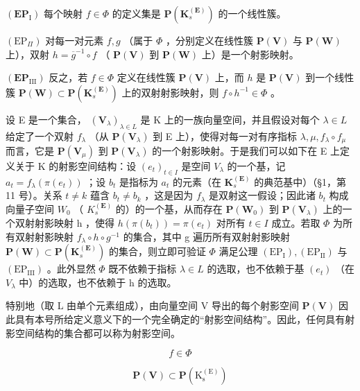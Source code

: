 \((\mathbf{EP}_{\mathrm{I}})\) 每个映射 \(f \in \Phi\) 的定义集是 \(\mathbf{P}(\mathbf{K}_s^{(\mathbf{E})})\) 的一个线性簇。

\((\mathrm{EP}_{\Pi})\) 对每一对元素 \(f, g\) （属于 \(\Phi\) ，分别定义在线性簇 \(\mathbf{P}(\mathbf{V})\) 与 \(\mathbf{P}(\mathbf{W})\) 上），双射 \(h = \overline{g}^{-1} \circ f\) （ \(\mathbf{P}(\mathbf{V})\) 到 \(\mathbf{P}(\mathbf{W})\) 上）是一个射影映射。

\((\mathbf{EP}_{\mathrm{III}})\) 反之，若 \(f \in \Phi\) 定义在线性簇 \(\mathbf{P}(\mathbf{V})\) 上，而 \(h\) 是 \(\mathbf{P}(\mathbf{V})\) 到一个线性簇 \(\mathbf{P}(\mathbf{W}) \subset \mathbf{P}(\mathbf{K}_s^{\mathbf{(E)}})\) 上的双射射影映射，则 \(f \circ h^{-1} \in \Phi\) 。

设 E 是一个集合， \((\mathbf{V}_{\lambda})_{\lambda \in L}\) 是 K 上的一族向量空间，并且假设对每个 \(\lambda \in L\) 给定了一个双射 \(f_{\lambda}\) （从 \(\mathbf{P}(\mathbf{V}_{\lambda})\) 到 E 上），使得对每一对有序指标 \(\lambda, \mu, f_{\lambda} \circ f_{\mu}\) 而言，它是 \(\mathbf{P}(\mathbf{V}_{\mu})\) 到 \(\mathbf{P}(\mathbf{V}_{\lambda})\) 的一个射影映射。于是我们可以如下在 E 上定义关于 K 的射影空间结构：设 \((e_{t})_{t \in I}\) 是空间 \(V_{\lambda}\) 的一个基，记 \(a_{t} = f_{\lambda}(\pi(e_{t}))\) ；设 \(b_{t}\) 是指标为 \(a_{t}\) 的元素（在 \(\mathbf{K}_{s}^{(\mathbf{E})}\) 的典范基中）（§1，第 11 号）。关系 \(t \neq k\) 蕴含 \(b_{t} \neq b_{k}\) ，这是因为 \(f_{\lambda}\) 是双射这一假设；因此诸 \(b_{t}\) 构成向量子空间 \(W_{0}\) （ \(K_{s}^{(\mathbf{E})}\) 的）的一个基，从而存在 \(\mathbf{P}(\mathbf{W}_{0})\) 到 \(\mathbf{P}(\mathbf{V}_{\lambda})\) 上的一个双射射影映射 h ，使得 \(h(\pi(b_{t})) = \pi(e_{t})\) 对所有 \(t \in I\) 成立。若取 \(\Phi\) 为所有双射射影映射 \(f_{\lambda} \circ h \circ g^{-1}\) 的集合，其中 g 遍历所有双射射影映射 \(\mathbf{P}(\mathbf{W}) \subset \mathbf{P}(\mathbf{K}_{s}^{(\mathbf{E})})\) 的集合，则立即可验证 \(\Phi\) 满足公理 \((\mathrm{EP}_{\mathrm{I}}), (\mathrm{EP}_{\mathrm{II}})\) 与 \((\mathrm{EP}_{\mathrm{III}})\) 。此外显然 \(\Phi\) 既不依赖于指标 \(\lambda \in L\) 的选取，也不依赖于基 \((e_{t})\) （在 \(V_{\lambda}\) 中）的选取，也不依赖于 h 的选取。

特别地（取 L 由单个元素组成），由向量空间 V 导出的每个射影空间 \(\mathbf{P}(\mathbf{V})\) 因此具有本号所给定义意义下的一个完全确定的“射影空间结构”。因此，任何具有射影空间结构的集合都可以称为射影空间。

\[
f \in \Phi
\]

\[
\mathbf {P} (\mathbf {V}) \subset \mathbf {P} \left(\mathrm{K} _ {\mathrm{s}} ^ {(\mathrm{E})}\right)
\]

